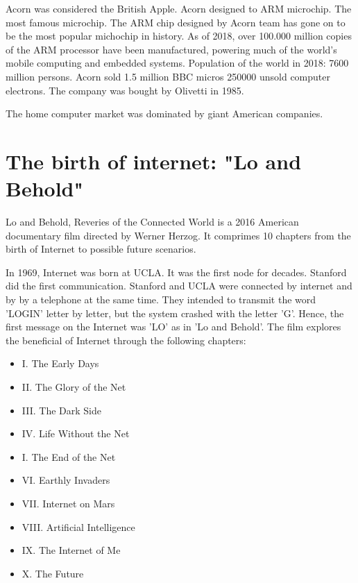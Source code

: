     
    
 Acorn was considered the British Apple.    
 Acorn designed to ARM microchip. The most famous microchip.
 The ARM chip designed by Acorn team has gone on to be the most popular michochip in history.  
 As of 2018, over 100.000 million copies of the ARM processor have been manufactured, powering much of the world's mobile computing and 
 embedded systems. Population of the world in 2018: 7600 million persons. 
 Acorn sold 1.5 million BBC micros 
 250000 unsold computer electrons.     
 The company was bought by Olivetti in 1985. 
      
    
 The home computer market was dominated by giant American companies. 
       
  
 
    
   
    
 \section*{The birth of internet: "Lo and Behold"} 
 Lo and Behold, Reveries of the Connected World is a 2016 American documentary film 
 directed by Werner Herzog. It comprimes 10 chapters from the birth of Internet to possible future 
 scenarios. 
 
 In 1969, Internet was born at UCLA.   
 It was the first node for decades. 
 Stanford did the first communication. 
 Stanford and UCLA were connected by internet and by by a telephone at the same time.  
 They intended to transmit the word 'LOGIN' letter by letter,  
 but the system crashed with the letter 'G'. 
 Hence, the first message on the Internet was 'LO' as in 'Lo and Behold'.    
 The film explores the beneficial of  Internet through the following chapters: 
 \begin{itemize} 
 \setlength\itemsep{0cm}
 \item I. The Early Days
 \item II.  The Glory of the Net
 \item III. The Dark Side
 \item IV. Life Without the Net
 \item I. The End of the Net
 \item VI.  Earthly Invaders
 \item VII.  Internet on Mars
 \item VIII.  Artificial Intelligence
 \item IX. The Internet of Me
 \item X. The Future
 \end{itemize} 
 
